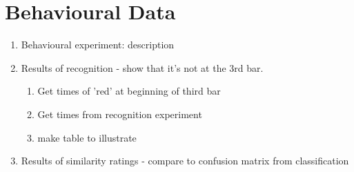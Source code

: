 \chapter*{Behavioural Data}

\begin{enumerate}
\item Behavioural experiment: description

\item Results of recognition - show that it's not at the 3rd bar. 
	\begin{enumerate}
	\item Get times of 'red' at beginning of third bar
	\item Get times from recognition experiment
	\item make table to illustrate
	\end{enumerate}

\item Results of similarity ratings - compare to confusion matrix from classification
\end{enumerate}